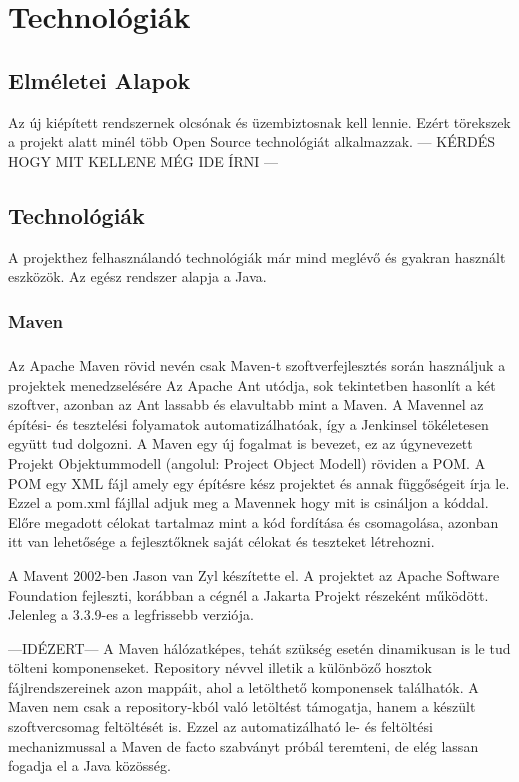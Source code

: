 \chapter{Technológiák}
\label{chapTech}

\section{Elméletei Alapok}

Az új kiépített rendszernek olcsónak és üzembiztosnak kell lennie. Ezért törekszek a projekt alatt minél több Open Source technológiát alkalmazzak. 
--- KÉRDÉS HOGY MIT KELLENE MÉG IDE ÍRNI ---

\section{Technológiák}
A projekthez felhasználandó technológiák már mind meglévő és gyakran használt eszközök. 
Az egész rendszer alapja a Java.

\subsection{Maven}
\paragraph{}
Az Apache Maven rövid nevén csak Maven-t szoftverfejlesztés során használjuk a projektek menedzselésére 
Az Apache Ant utódja, sok tekintetben hasonlít a két szoftver, azonban az Ant lassabb és elavultabb mint a Maven. 
A Mavennel az építési- és tesztelési folyamatok automatizálhatóak, így a Jenkinsel tökéletesen együtt tud dolgozni. 
A Maven egy új fogalmat is bevezet, ez az úgynevezett Projekt Objektummodell (angolul: Project Object Modell) röviden a POM. 
A POM egy XML fájl amely egy építésre kész projektet és annak függőségeit írja le. 
Ezzel a pom.xml fájllal adjuk meg a Mavennek hogy mit is csináljon a kóddal.
Előre megadott célokat tartalmaz mint a kód fordítása és csomagolása, azonban itt van lehetősége a fejlesztőknek saját célokat és teszteket létrehozni. 

A Mavent 2002-ben Jason van Zyl készítette el. A projektet az Apache Software Foundation fejleszti, korábban a cégnél a Jakarta Projekt részeként működött. Jelenleg a 3.3.9-es a legfrissebb verziója.

---IDÉZERT---
A Maven hálózatképes, tehát szükség esetén dinamikusan is le tud tölteni komponenseket. Repository névvel illetik a különböző hosztok fájlrendszereinek azon mappáit, ahol a letölthető komponensek találhatók. A Maven nem csak a repository-kból való letöltést támogatja, hanem a készült szoftvercsomag feltöltését is. Ezzel az automatizálható le- és feltöltési mechanizmussal a Maven de facto szabványt próbál teremteni, de elég lassan fogadja el a Java közösség.

